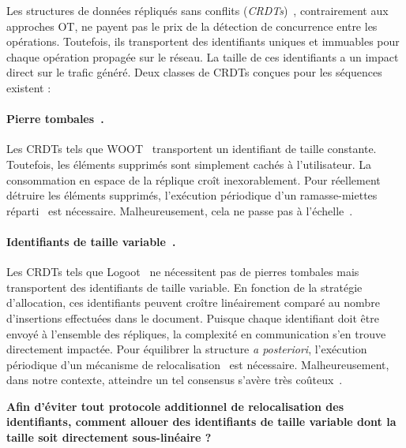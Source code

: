 Les structures de données répliqués sans conflits
(\emph{CRDTs})~\cite{burckhardt2014replicated, shapiro2011comprehensive,
shapiro2011conflict}, contrairement aux approches OT, ne payent pas le prix de
la détection de concurrence entre les opérations. Toutefois, ils transportent
des identifiants uniques et immuables pour chaque opération propagée sur le
réseau. La taille de ces identifiants a un impact direct sur le trafic généré.
Deux classes de CRDTs conçues pour les séquences existent :

\paragraph{Pierre tombales~\cite{ahmed2011evaluating, attiya2016specification,
conway2014language, grishchenko2010deep, oster2006data, roh2011replicated,
weiss2007wooki, wu2010partial, yu2012stringwise}.} Les CRDTs tels que
WOOT~\cite{oster2006data} transportent un identifiant de taille constante.  
Toutefois, les éléments supprimés sont simplement cachés à l'utilisateur. La
consommation en espace de la réplique croît inexorablement. 
Pour réellement détruire les éléments supprimés, l'exécution périodique d'un
ramasse-miettes réparti~\cite{abdullahi1998garbage} est
nécessaire. Malheureusement, cela ne passe pas à
l'échelle~\cite{abdullahi1998garbage}.

\paragraph{Identifiants de taille variable~\cite{andre2013supporting,
 preguica2009commutative, weiss2009logoot}.} Les CRDTs tels que
Logoot~\cite{weiss2009logoot} ne nécessitent pas de pierres tombales mais
transportent des identifiants de taille variable. En fonction de la stratégie
d'allocation, ces identifiants peuvent croître linéairement comparé au nombre
d'insertions effectuées dans le document. Puisque chaque identifiant doit être
envoyé à l'ensemble des répliques, la complexité en communication s'en trouve
directement impactée. Pour équilibrer la structure \emph{a posteriori},
l'exécution périodique d'un mécanisme de relocalisation~\cite{letia2009crdts}
est nécessaire. Malheureusement, dans notre contexte, atteindre un tel consensus
s'avère très coûteux~\cite{mostefaoui2015signature}.

\textbf{Afin d'éviter tout protocole additionnel de relocalisation des
identifiants, comment allouer des identifiants de taille variable dont la taille
soit directement sous-linéaire ?}

